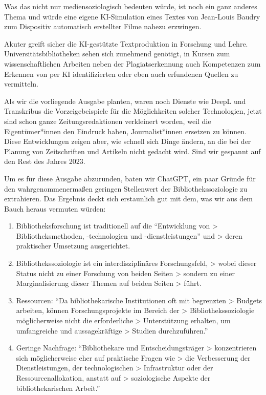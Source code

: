 \documentclass[a4paper,
fontsize=11pt,
oneside,
numbers=noperiodatend,
parskip=half-,
bibliography=totoc,
final
]{scrartcl}
\begin{document}
Was das nicht nur mediensoziologisch bedeuten würde, ist noch ein ganz
anderes Thema und würde eine eigene KI-Simulation eines Textes von
Jean-Louis Baudry zum Dispositiv automatisch erstellter Filme nahezu
erzwingen.

Akuter greift sicher die KI-gestützte Textproduktion in Forschung und
Lehre. Universitätsbibliotheken sehen sich zunehmend genötigt, in Kursen
zum wissenschaftlichen Arbeiten neben der Plagiatserkennung auch
Kompetenzen zum Erkennen von per KI identifizierten oder eben auch
erfundenen Quellen zu vermitteln.

Als wir die vorliegende Ausgabe planten, waren noch Dienste wie DeepL
und Transkribus die Vorzeigebeispiele für die Möglichkeiten solcher
Technologien, jetzt sind schon ganze Zeitungsredaktionen verkleinert
worden, weil die Eigentümer*innen den Eindruck haben, Journalist*innen
ersetzen zu können. Diese Entwicklungen zeigen aber, wie schnell sich
Dinge ändern, an die bei der Planung von Zeitschriften und Artikeln
nicht gedacht wird. Sind wir gespannt auf den Rest des Jahres 2023.

Um es für diese Ausgabe abzurunden, baten wir ChatGPT, ein paar Gründe
für den wahrgenommenermaßen geringen Stellenwert der
Bibliothekssoziologie zu extrahieren. Das Ergebnis deckt sich
erstaunlich gut mit dem, was wir aus dem Bauch heraus vermuten würden:

\begin{enumerate}
\def\labelenumi{\arabic{enumi}.}
\item
  Bibliotheksforschung ist traditionell auf die \enquote{Entwicklung von
  \textgreater{} Bibliotheksmethoden, -technologien und
  -dienstleistungen} und \textgreater{} deren praktischer Umsetzung
  ausgerichtet.
\item
  Bibliothekssoziologie ist ein interdisziplinäres Forschungsfeld,
  \textgreater{} wobei dieser Status nicht zu einer Forschung von beiden
  Seiten \textgreater{} sondern zu einer Marginalisierung dieser Themen
  auf beiden Seiten \textgreater{} führt.
\item
  Ressourcen: \enquote{Da bibliothekarische Institutionen oft mit
  begrenzten \textgreater{} Budgets arbeiten, können Forschungsprojekte
  im Bereich der \textgreater{} Bibliothekssoziologie möglicherweise
  nicht die erforderliche \textgreater{} Unterstützung erhalten, um
  umfangreiche und aussagekräftige \textgreater{} Studien
  durchzuführen.}
\item
  Geringe Nachfrage: \enquote{Bibliothekare und Entscheidungsträger
  \textgreater{} konzentrieren sich möglicherweise eher auf praktische
  Fragen wie \textgreater{} die Verbesserung der Dienstleistungen, der
  technologischen \textgreater{} Infrastruktur oder der
  Ressourcenallokation, anstatt auf \textgreater{} soziologische Aspekte
  der bibliothekarischen Arbeit.}
\end{enumerate}
\end{document}
